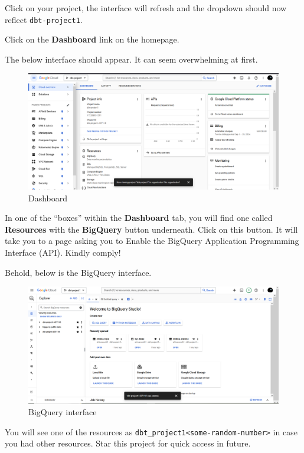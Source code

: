 \documentclass[
]{book}
\begin{document}
Click on your project, the interface will refresh and the dropdown should now reflect \texttt{dbt-project1}.

Click on the \textbf{Dashboard} link on the homepage.

The below interface should appear. It can seem overwhelming at first.

\begin{figure}
\centering
\includegraphics{./images/dashboard.png}
\caption{Dashboard}
\end{figure}

In one of the ``boxes'' within the \textbf{Dashboard} tab, you will find one called \textbf{Resources} with the \textbf{BigQuery} button underneath. Click on this button. It will take you to a page asking you to Enable the BigQuery Application Programming Interface (API). Kindly comply!

Behold, below is the BigQuery interface.

\begin{figure}
\centering
\includegraphics{./images/bigquery_interface.png}
\caption{BigQuery interface}
\end{figure}

You will see one of the resources as \texttt{dbt\_project1\textless{}some-random-number\textgreater{}} in case you had other resources. Star this project for quick access in future.
\end{document}

